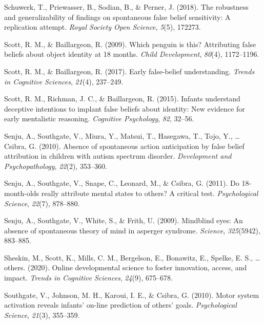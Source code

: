 \documentclass[
  english,
  man,floatsintext]{apa6}
\newlength{\cslhangindent}
\newlength{\cslentryspacingunit} %
\newenvironment{CSLReferences}[2] %
 {%
  \setlength{\parindent}{0pt}
  \ifodd #1
  \let\oldpar\par
  \def\par{\hangindent=\cslhangindent\oldpar}
  \fi
  \setlength{\parskip}{#2\cslentryspacingunit}
 }%
 {}
\begin{document}
\begin{CSLReferences}{1}{0}
\leavevmode{}%
Schuwerk, T., Priewasser, B., Sodian, B., \& Perner, J. (2018). The robustness and generalizability of findings on spontaneous false belief sensitivity: A replication attempt. \emph{Royal Society Open Science}, \emph{5}(5), 172273.

\leavevmode{}%
Scott, R. M., \& Baillargeon, R. (2009). Which penguin is this? Attributing false beliefs about object identity at 18 months. \emph{Child Development}, \emph{80}(4), 1172--1196.

\leavevmode{}%
Scott, R. M., \& Baillargeon, R. (2017). Early false-belief understanding. \emph{Trends in Cognitive Sciences}, \emph{21}(4), 237--249.

\leavevmode{}%
Scott, R. M., Richman, J. C., \& Baillargeon, R. (2015). Infants understand deceptive intentions to implant false beliefs about identity: New evidence for early mentalistic reasoning. \emph{Cognitive Psychology}, \emph{82}, 32--56.

\leavevmode{}%
Senju, A., Southgate, V., Miura, Y., Matsui, T., Hasegawa, T., Tojo, Y., \ldots{} Csibra, G. (2010). Absence of spontaneous action anticipation by false belief attribution in children with autism spectrum disorder. \emph{Development and Psychopathology}, \emph{22}(2), 353--360.

\leavevmode{}%
Senju, A., Southgate, V., Snape, C., Leonard, M., \& Csibra, G. (2011). Do 18-month-olds really attribute mental states to others? A critical test. \emph{Psychological Science}, \emph{22}(7), 878--880.

\leavevmode{}%
Senju, A., Southgate, V., White, S., \& Frith, U. (2009). Mindblind eyes: An absence of spontaneous theory of mind in asperger syndrome. \emph{Science}, \emph{325}(5942), 883--885.

\leavevmode{}%
Sheskin, M., Scott, K., Mills, C. M., Bergelson, E., Bonawitz, E., Spelke, E. S., \ldots{} others. (2020). Online developmental science to foster innovation, access, and impact. \emph{Trends in Cognitive Sciences}, \emph{24}(9), 675--678.

\leavevmode{}%
Southgate, V., Johnson, M. H., Karoui, I. E., \& Csibra, G. (2010). Motor system activation reveals infants' on-line prediction of others' goals. \emph{Psychological Science}, \emph{21}(3), 355--359.


\end{CSLReferences}
\end{document}
